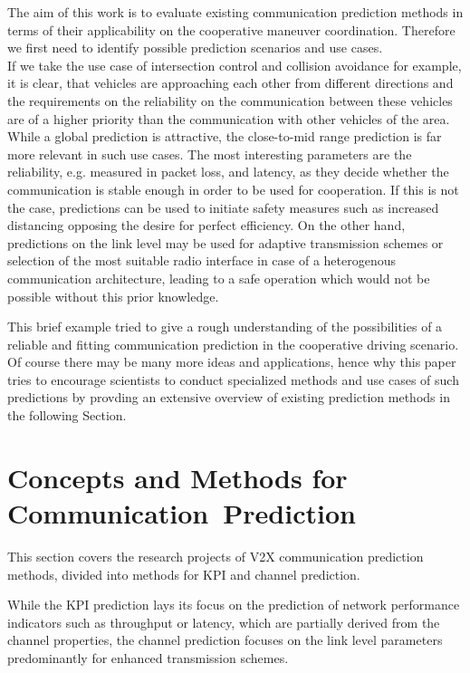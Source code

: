 \documentclass[conference]{IEEEtran}
\begin{document}
The aim of this work is to evaluate existing communication prediction methods in terms of their applicability on the cooperative maneuver coordination. Therefore we first need to identify possible prediction scenarios and use cases.\\
If we take the use case of intersection control and collision avoidance for example, it is clear, that vehicles are approaching each other from different directions and the requirements on the reliability on the communication between these vehicles are of a higher priority than the communication with other vehicles of the area. While a global prediction is attractive, the close-to-mid range prediction is far more relevant in such use cases. The most interesting parameters are the reliability, e.g. measured in packet loss, and latency, as they decide whether the communication is stable enough in order to be used for cooperation. If this is not the case, predictions can be used to initiate safety measures such as increased distancing opposing the desire for perfect efficiency. On the other hand, predictions on the link level may be used for adaptive transmission schemes or selection of the most suitable radio interface in case of a heterogenous communication architecture, leading to a safe operation which would not be possible without this prior knowledge.

This brief example tried to give a rough understanding of the possibilities of a reliable and fitting communication prediction in the cooperative driving scenario. Of course there may be many more ideas and applications, hence why this paper tries to encourage scientists to conduct specialized methods and use cases of such predictions by provding an extensive overview of existing prediction methods in the following Section.

\section{Concepts and Methods for Communication~Prediction}\label{sec:methods}
This section covers the research projects of V2X communication prediction methods, divided into methods for KPI and channel prediction.

While the KPI prediction lays its focus on the prediction of network performance indicators such as throughput or latency, which are partially derived from the channel properties, the channel prediction focuses on the link level parameters predominantly for enhanced transmission schemes.
\end{document}
